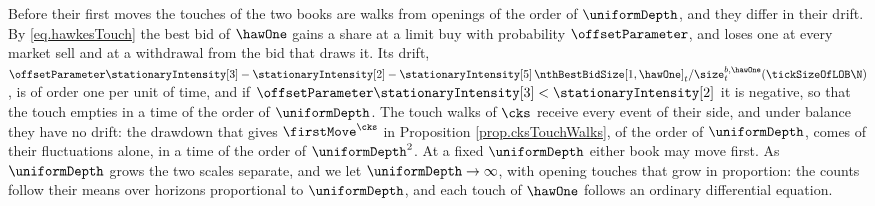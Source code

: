 Before their first moves the touches of the two books are walks
from openings of the order of $\uniformDepth$,
and they differ in their drift.
By \eqref{eq.hawkesTouch}
the best bid of $\hawOne$ gains a share at a limit buy with probability $\offsetParameter$,
and loses one at every market sell
and at a withdrawal from the bid that draws it.
Its drift,
$\offsetParameter\stationaryIntensity[3] - \stationaryIntensity[2]
- \stationaryIntensity[5] \, \nthBestBidSize[1,\hawOne]_t / \size^{b,\hawOne}_t(\tickSizeOfLOB\N)$,
is of order one per unit of time,
and if $\offsetParameter\stationaryIntensity[3] < \stationaryIntensity[2]$ it is negative,
so that the touch empties in a time of the order of $\uniformDepth$.
The touch walks of $\cks$ receive every event of their side,
and under balance they have no drift:
the drawdown that gives $\firstMove^{\cks}$ in Proposition \ref{prop.cksTouchWalks},
of the order of $\uniformDepth$,
comes of their fluctuations alone,
in a time of the order of $\uniformDepth^{2}$.
At a fixed $\uniformDepth$ either book may move first.
As $\uniformDepth$ grows the two scales separate,
and we let $\uniformDepth \to \infty$,
with opening touches that grow in proportion:
the counts follow their means over horizons proportional to $\uniformDepth$,
and each touch of $\hawOne$ follows an ordinary differential equation.

